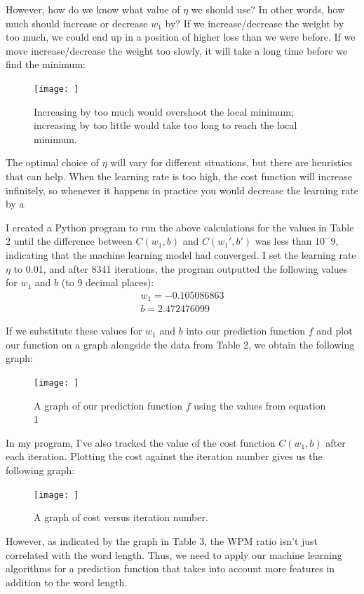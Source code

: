 \documentclass[12pt, demo]{article}
\begin{document}
However, how do we know what value of $\eta$ we should use? In other words, how much should increase or decrease $w_1$ by? If we increase/decrease the weight by too much, we could end up in a position of higher loss than we were before. If we move increase/decrease the weight too slowly, it will take a long time before we find the minimum:

\begin{figure}[H]
	\centering
	\caption{Increasing by too much would overshoot the local minimum; increasing by too little would take too long to reach the local minimum.}
	\texttt{[image: ]}
\end{figure}

The optimal choice of $\eta$ will vary for different situations, but there are heuristics that can help. When the learning rate is too high, the cost function will increase infinitely, so whenever it happens in practice you would decrease the learning rate by a %

I created a Python program to run the above calculations for the values in Table 2 until the difference between $C(w_1, b)$ and $C(w_1', b')$ was less than $10^-9$, indicating that the machine learning model had converged. I set the learning rate $\eta$ to 0.01, and after 8341 iterations, the program outputted the following values for $w_1$ and $b$ (to 9 decimal places):
\begin{align}
	w_1 = -0.105086863 \\
	b = 2.472476099
\end{align}

If we substitute these values for $w_1$ and $b$ into our prediction function $f$ and plot our function on a graph alongside the data from Table 2, we obtain the following graph:
\begin{figure}[H]
	\centering
	\caption{A graph of our prediction function $f$ using the values from equation 1}
	\texttt{[image: ]}
\end{figure}

In my program, I've also tracked the value of the cost function $C(w_1, b)$ after each iteration. Plotting the cost against the iteration number gives us the following graph:
\begin{figure}[H]
	\centering
	\caption{A graph of cost versus iteration number.}
	\texttt{[image: ]}
\end{figure}

However, as indicated by the graph in Table 3, the WPM ratio isn't just correlated with the word length. Thus, we need to apply our machine learning algorithms for a prediction function that takes into account more features in addition to the word length.
\end{document}
